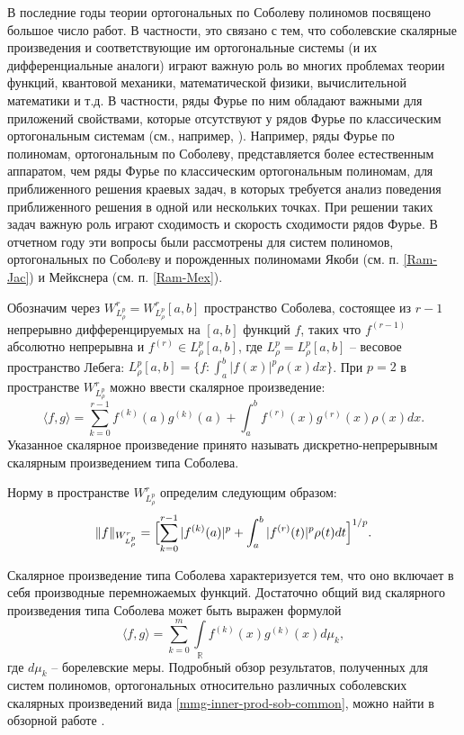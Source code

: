 \Introduction


В последние годы теории ортогональных по Соболеву полиномов посвящено большое число работ. В частности, это связано с тем, что соболевские скалярные произведения и соответствующие им ортогональные системы (и их дифференциальные аналоги) играют важную роль во многих проблемах теории функций, квантовой механики, математической физики, вычислительной математики и т.д. В частности, ряды Фурье по ним обладают важными для приложений свойствами, которые отсутствуют у рядов Фурье по классическим ортогональным системам (см., например, \cite{Ram-Ba-Ra-Pe,Ram-Mar-Xu,Ram-Shar-UMN}).
Например, ряды Фурье по полиномам, ортогональным по Соболеву, представляется более естественным аппаратом, чем ряды Фурье по классическим ортогональным полиномам, для приближенного решения краевых задач, в которых требуется анализ поведения приближенного решения в одной или нескольких точках.
При решении таких задач важную роль играют сходимость и скорость сходимости рядов Фурье. В отчетном году эти вопросы были рассмотрены для систем полиномов, ортогональных по Соболeву и порожденных полиномами Якоби (см. п. \ref{Ram-Jac}) и Мейкснера (см. п. \ref{Ram-Mex}).

Обозначим через $W^r_{L^p_\rho}=W^r_{L^p_\rho}[a,b]$ пространство Соболева, состоящее из $r-1$ непрерывно дифференцируемых на $[a,b]$ функций $f$, таких что $f^{(r-1)}$ абсолютно непрерывна и $f^{(r)} \in L^p_\rho[a,b]$, где $L^p_\rho=L^p_\rho[a,b]$ -- весовое пространство Лебега: $L^p_\rho[a,b] = \{ f: \int_a^b |f(x)|^p\rho(x)dx \}$. При $p=2$ в пространстве $W^r_{L^p_\rho}$ можно ввести скалярное произведение:
\begin{equation}\label{mmg-sob-prod}
	\langle f, g \rangle = \sum_{k=0}^{r-1}f^{(k)}(a)g^{(k)}(a)+\int_a^b f^{(r)}(x)g^{(r)}(x)\rho(x)dx.
\end{equation}
Указанное скалярное произведение принято называть дискретно-непрерывным скалярным произведением типа Соболева.

Норму в пространстве $W^r_{L^p_\rho}$ определим следующим образом:
\begin{equation}\label{mmg-sob-norm-def}
	\|f\|_{W^r_{L^p_\rho}} = \Bigl[
	\sum_{k=0}^{r-1}|f^{(k)}(a)|^p + \int_a^b |f^{(r)}(t)|^p \rho(t)dt
	\Bigr]^{1/p}.
\end{equation}

Скалярное произведение типа Соболева характеризуется тем, что оно включает в себя производные перемножаемых функций. Достаточно общий вид скалярного произведения типа Соболева может быть выражен формулой
\begin{equation}\label{mmg-inner-prod-sob-common}
	\langle f,g \rangle = \sum_{k=0}^{m}\int\limits_{\mathbb{R}}f^{(k)}(x)g^{(k)}(x)d\mu_k,
\end{equation}
где $d\mu_k$ -- борелевские меры. Подробный обзор результатов, полученных для систем полиномов, ортогональных относительно различных соболевских скалярных произведений вида \eqref{mmg-inner-prod-sob-common}, можно найти в обзорной работе \cite{mmg-MarcellanXu2015}.

